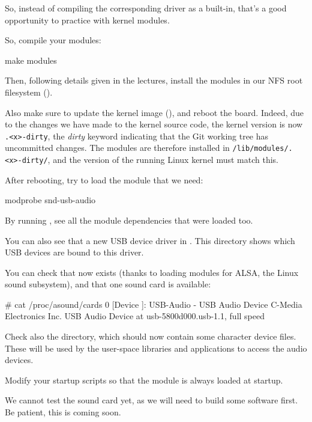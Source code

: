 So, instead of compiling the corresponding driver as a built-in, that's
a good opportunity to practice with kernel modules.

So, compile your modules:
\begin{bashinput}
make modules
\end{bashinput}

Then, following details given in the lectures, install the modules in our NFS
root filesystem ().

Also make sure to update the kernel image (), and reboot the
board.  Indeed, due to the changes we have made to the kernel source code,
the kernel version is now {\tt \workingkernel.<x>-dirty}, the {\em dirty}
keyword indicating that the Git working tree has uncommitted changes.
The modules are therefore installed in {\tt /lib/modules/\workingkernel.<x>-dirty/},
and the version of the running Linux kernel must match this.

After rebooting, try to load the module that we need:

\begin{bashinput}
modprobe snd-usb-audio
\end{bashinput}

By running , see all the module dependencies that
were loaded too.

You can also see that a new USB device driver in
. This directory shows which
USB devices are bound to this driver.

You can check that  now exists (thanks to loading
modules for ALSA, the Linux sound subsystem), and that one sound
card is available:

\begin{bashinput}
# cat /proc/asound/cards
 0 [Device         ]: USB-Audio - USB Audio Device
                      C-Media Electronics Inc. USB Audio Device at usb-5800d000.usb-1.1, full speed
\end{bashinput}

Check also the  directory, which should now contain
some character device files. These will be used by the user-space
libraries and applications to access the audio devices.

Modify your startup scripts so that the  module
is always loaded at startup.

We cannot test the sound card yet, as we will need to build some
software first. Be patient, this is coming soon.


